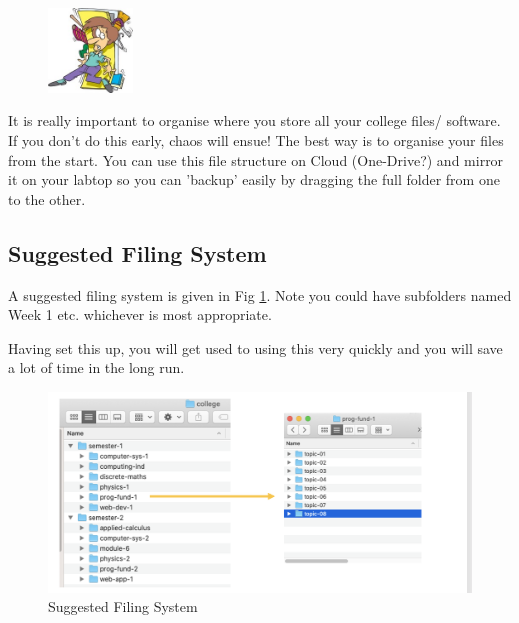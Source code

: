 \documentclass{article}
\begin{document}
\begin{figure} %
    \centering
    \includegraphics[width=0.2\textwidth]{img/chaos.jpg}
\end{figure}

It is really important to organise where you store all your college files/ software.
If you don’t do this early, chaos will ensue! The best way is to organise your files from the start. 
You can use this file structure on Cloud (One-Drive?) and mirror it on your labtop so you can 'backup' easily by dragging the full folder from one to the other. 
  
\subsection{Suggested Filing System}

A suggested filing system is given in Fig \ref{filing}. Note you could have subfolders named Week 1 etc. whichever is most appropriate. 

Having set this up, you will get used to using this very quickly and you will save a lot of time in the long run. 
\begin{figure}[h]
\centering
\includegraphics[width=.6\textwidth]{img/filing.png}
\caption{Suggested Filing System}
\label{filing}
\end{figure}
\end{document}
